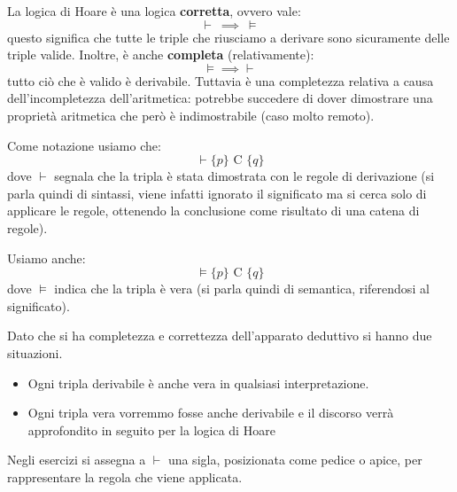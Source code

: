 La logica di Hoare è una logica \textbf{corretta}, ovvero vale:
\begin{equation}
    \vdash \ \implies \ \models
\end{equation}
questo significa che tutte le triple che riusciamo a derivare sono sicuramente
delle triple valide. Inoltre, è anche \textbf{completa} (relativamente):
\begin{equation}
    \models \implies \vdash
\end{equation}
tutto ciò che è valido è derivabile. Tuttavia è una completezza relativa a causa
dell'incompletezza dell'aritmetica: potrebbe succedere di dover dimostrare una
proprietà aritmetica che però è indimostrabile (caso molto remoto).

Come notazione usiamo che:
\begin{equation}
    \vdash \{p\} \text{ C } \{q\}
\end{equation}
dove $\vdash$ segnala che la tripla è stata dimostrata con le regole di
derivazione (si parla quindi di sintassi, viene infatti ignorato il significato
ma si cerca solo di applicare le regole, ottenendo la conclusione come risultato
di una catena di regole).

Usiamo anche:
\begin{equation}
    \models \{p\} \text{ C } \{q\}
\end{equation}
dove $\models$ indica che la tripla è vera (si parla quindi di semantica,
riferendosi al significato).

Dato che si ha completezza e correttezza dell'apparato deduttivo si hanno due
situazioni.
\begin{itemize}
    \item Ogni tripla derivabile è anche vera in qualsiasi interpretazione.
    \item Ogni tripla vera vorremmo fosse anche derivabile e il discorso verrà
          approfondito in seguito per la logica di Hoare
\end{itemize}
\begin{nota}
    Negli esercizi si assegna a $\vdash$ una sigla, posizionata come pedice o
    apice, per rappresentare la regola che viene applicata.
\end{nota}
